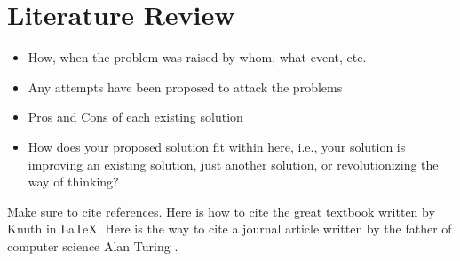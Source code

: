 \section{Literature Review}
\begin{itemize}

\item How, when the problem was raised by whom, what event, etc. 
\item Any attempts have been proposed to attack the problems
\item Pros and Cons of each existing solution
\item How does your proposed solution fit within here, i.e., your solution is improving an existing solution, just another solution, or revolutionizing the way of thinking?
\end{itemize}

Make sure to cite references. Here is how to cite the great textbook written by Knuth \cite{knuth2006art} in \LaTeX{}. Here is the way to cite a journal article written by the father of computer science Alan Turing \cite{turing1950computing}. 